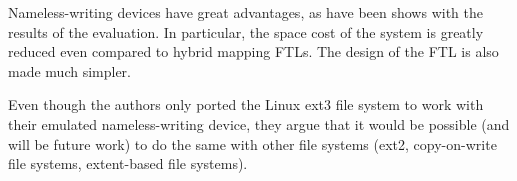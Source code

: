 \documentclass[twocolumn,a4paper,10pt]{article}
\begin{document}
Nameless-writing devices have great advantages, as have been shows with the
results of the evaluation. In particular, the space cost of the system is
greatly reduced even compared to hybrid mapping FTLs. The design of the FTL is
also made much simpler.

Even though the authors only ported the Linux ext3 file system to work with
their emulated nameless-writing device, they argue that it would be possible
(and will be future work) to do the same with other file systems (ext2,
copy-on-write file systems, extent-based file systems).
\end{document}
